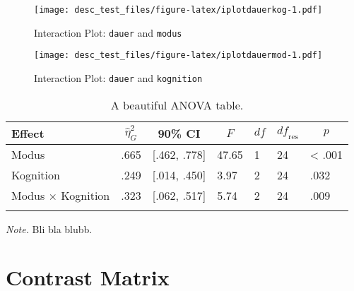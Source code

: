 \documentclass[
  doc,floatsintext]{apa6}
\newenvironment{Shaded}{\begin{snugshade}}{\end{snugshade}}
\newcommand{\DecValTok}[1]{\textcolor[rgb]{0.00,0.00,0.81}{#1}}
\newcommand{\FunctionTok}[1]{\textcolor[rgb]{0.13,0.29,0.53}{\textbf{#1}}}
\newcommand{\NormalTok}[1]{#1}
\newcommand{\OtherTok}[1]{\textcolor[rgb]{0.56,0.35,0.01}{#1}}
\newcommand{\SpecialCharTok}[1]{\textcolor[rgb]{0.81,0.36,0.00}{\textbf{#1}}}
\begin{document}
\begin{figure}
\centering
\texttt{[image: desc\_test\_files/figure-latex/iplotdauerkog-1.pdf]}
\caption{\label{fig:iplotdauerkog}Interaction Plot: \texttt{dauer} and \texttt{modus}}
\end{figure}

\begin{figure}
\centering
\texttt{[image: desc\_test\_files/figure-latex/iplotdauermod-1.pdf]}
\caption{\label{fig:iplotdauermod}Interaction Plot: \texttt{dauer} and \texttt{kognition}}
\end{figure}

\begin{table}[tbp]

\begin{center}
\begin{threeparttable}

\caption{\label{tab:tabanova}A beautiful ANOVA table.}

\begin{tabular}{lllllll}
\toprule
Effect & \multicolumn{1}{c}{$\hat{\eta}^2_G$} & \multicolumn{1}{c}{90\% CI} & \multicolumn{1}{c}{$F$} & \multicolumn{1}{c}{$\mathit{df}$} & \multicolumn{1}{c}{$\mathit{df}_{\mathrm{res}}$} & \multicolumn{1}{c}{$p$}\\
\midrule
Modus & .665 & {}[.462, .778] & 47.65 & 1 & 24 & < .001\\
Kognition & .249 & {}[.014, .450] & 3.97 & 2 & 24 & .032\\
Modus $\times$ Kognition & .323 & {}[.062, .517] & 5.74 & 2 & 24 & .009\\
\bottomrule
\addlinespace
\end{tabular}

\begin{tablenotes}[para]
\normalsize{\textit{Note.} Bli bla blubb.}
\end{tablenotes}

\end{threeparttable}
\end{center}

\end{table}

\hypertarget{contrast-matrix}{%
\section{Contrast Matrix}\label{contrast-matrix}}

\begin{Shaded}
\end{Shaded}
\end{document}
